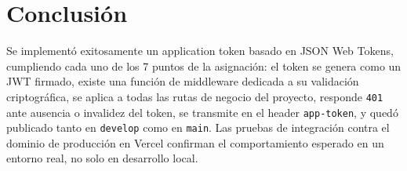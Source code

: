 \documentclass[11pt,letterpaper]{article}
\begin{document}
\section{Conclusión}

Se implementó exitosamente un application token basado en JSON Web Tokens, cumpliendo cada uno
de los 7 puntos de la asignación: el token se genera como un JWT firmado, existe una función de
middleware dedicada a su validación criptográfica, se aplica a todas las rutas de negocio del
proyecto, responde \texttt{401} ante ausencia o invalidez del token, se transmite en el header
\texttt{app-token}, y quedó publicado tanto en \texttt{develop} como en \texttt{main}. Las
pruebas de integración contra el dominio de producción en Vercel confirman el comportamiento
esperado en un entorno real, no solo en desarrollo local.
\end{document}
